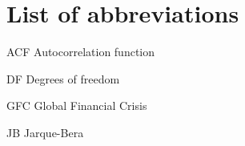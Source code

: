 \section*{List of abbreviations}

\begin{abbrv}
\item[ACF] Autocorrelation function
\item[DF] Degrees of freedom
\item[GFC] Global Financial Crisis
\item[JB] Jarque-Bera

\
\end{abbrv}
